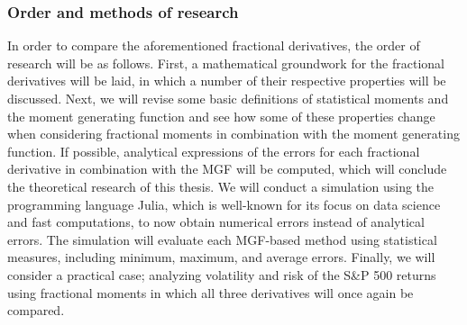 \subsubsection{Order and methods of research}
In order to compare the aforementioned fractional derivatives, the order of research will be as follows. First, a mathematical groundwork for the fractional derivatives will be laid, in which a number of their respective properties will be discussed. Next, we will revise some basic definitions of statistical moments and the moment generating function and see how some of these properties change when considering fractional moments in combination with the moment generating function. If possible, analytical expressions of the errors for each fractional derivative in combination with the MGF will be computed, which will conclude the theoretical research of this thesis. We will conduct a simulation using the programming language Julia, which is well-known for its focus on data science and fast computations, to now obtain numerical errors instead of analytical errors. The simulation will evaluate each MGF-based method using statistical measures, including minimum, maximum, and average errors. Finally, we will consider a practical case; analyzing volatility and risk of the S\&P 500 returns using fractional moments in which all three derivatives will once again be compared.



